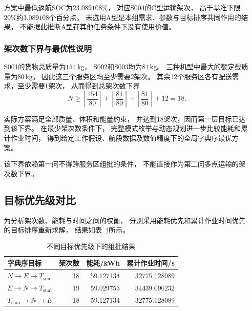 \documentclass[bwprint]{gmcmthesis}
\begin{document}
方案中最低返航SOC为$23.089108\%$，
对应S004的C型运输架次，
高于基准下限$20\%$约$3.089108$个百分点。
未选用A型是本组需求、参数与目标排序共同作用的结果，
不能据此推断A型在其他任务条件下没有使用价值。

\subsubsection{架次数下界与最优性说明}

S001的货物总质量为$154\,\mathrm{kg}$，
S002和S003均为$81\,\mathrm{kg}$。
三种机型中最大的额定载质量为$80\,\mathrm{kg}$，
因此这三个服务区均至少需要2架次。
其余12个服务区各有配送需求，至少需要1架次，
从而得到总架次数下界
\begin{equation}
    N
    \geq
    \left\lceil\frac{154}{80}\right\rceil
    +
    \left\lceil\frac{81}{80}\right\rceil
    +
    \left\lceil\frac{81}{80}\right\rceil
    +12
    =18.
\end{equation}

实际方案满足全部质量、体积和能量约束，
并达到18架次，因而第一层目标已达到该下界。
在最少架次数条件下，
完整模式枚举与动态规划进一步比较能耗和累计作业时间，
得到给定工作假设、航段数据及数值精度下的全局字典序最优方案。

该下界依赖第一问不得跨服务区组批的条件，
不能直接作为第二问多点运输的架次数下界。

\subsection{目标优先级对比}

为分析架次数、能耗与时间之间的权衡，
分别采用能耗优先和累计作业时间优先的目标排序重新求解，
结果如表~\ref{tab:q1_priority}所示。

\begin{table}[htbp]
    \centering
    \caption{不同目标优先级下的组批结果}
    \label{tab:q1_priority}
    \begin{tabular}{lrrr}
        \toprule
        字典序目标 & 架次数 & 能耗/kWh & 累计作业时间/s \\
        \midrule
        $N\rightarrow E\rightarrow T_{\mathrm{sum}}$
        &18&59.127134&32775.128089\\
        $E\rightarrow N\rightarrow T_{\mathrm{sum}}$
        &19&59.029753&34439.090232\\
        $T_{\mathrm{sum}}\rightarrow N\rightarrow E$
        &18&59.127134&32775.128089\\
        \bottomrule
    \end{tabular}
\end{table}
\end{document}
